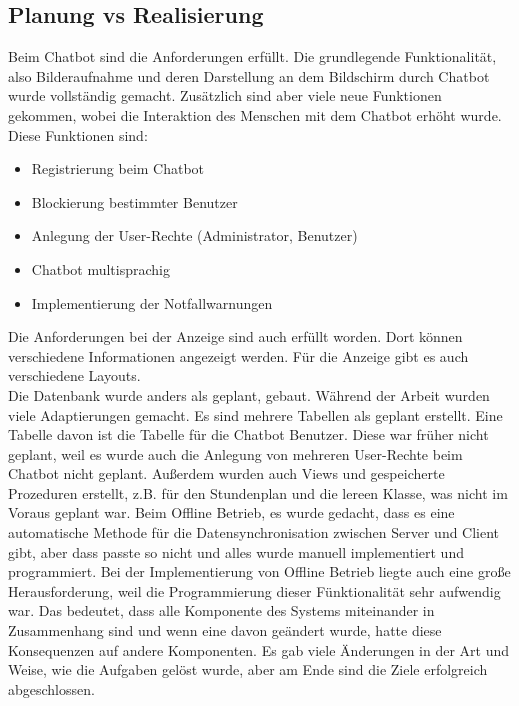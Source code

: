 \subsection{Planung vs Realisierung}
Beim Chatbot sind die Anforderungen erfüllt. Die grundlegende Funktionalität, also Bilderaufnahme und deren Darstellung an dem Bildschirm durch Chatbot wurde vollständig gemacht. Zusätzlich sind aber viele neue Funktionen gekommen, wobei die Interaktion des Menschen mit dem Chatbot erhöht wurde. \\
Diese Funktionen sind:
\begin{itemize}
	\item Registrierung beim Chatbot
\end{itemize}
\begin{itemize}
	\item Blockierung bestimmter Benutzer
\end{itemize}
\begin{itemize}
	\item Anlegung der User-Rechte (Administrator, Benutzer)
\end{itemize}
\begin{itemize}
	\item Chatbot multisprachig
\end{itemize}
\begin{itemize}
	\item Implementierung der Notfallwarnungen
\end{itemize}
Die Anforderungen bei der Anzeige sind auch erfüllt worden. Dort können verschiedene Informationen angezeigt werden. Für die Anzeige gibt es auch verschiedene Layouts. \\
Die Datenbank wurde anders als geplant, gebaut. Während der Arbeit wurden viele Adaptierungen gemacht. Es sind mehrere Tabellen als geplant erstellt. Eine Tabelle davon ist die Tabelle für die Chatbot Benutzer. Diese war früher nicht geplant, weil es wurde auch die Anlegung von mehreren User-Rechte beim Chatbot nicht geplant. Au\ss{}erdem wurden auch Views und gespeicherte Prozeduren erstellt, z.B. f\"ur den Stundenplan und die lereen Klasse, was nicht im Voraus geplant war. Beim Offline Betrieb, es wurde gedacht, dass es eine automatische Methode f\"ur die Datensynchronisation zwischen Server und Client gibt, aber dass passte so nicht und alles wurde manuell implementiert und programmiert. Bei der Implementierung von Offline Betrieb liegte auch eine gro\ss{}e Herausforderung, weil die Programmierung dieser F\"unktionalit\"at sehr aufwendig war. Das bedeutet, dass alle Komponente des Systems miteinander in Zusammenhang sind und wenn eine davon geändert wurde, hatte diese Konsequenzen auf andere Komponenten. Es gab viele \"Anderungen in der Art und Weise, wie die Aufgaben gel\"ost wurde, aber am Ende sind die Ziele erfolgreich abgeschlossen. 
